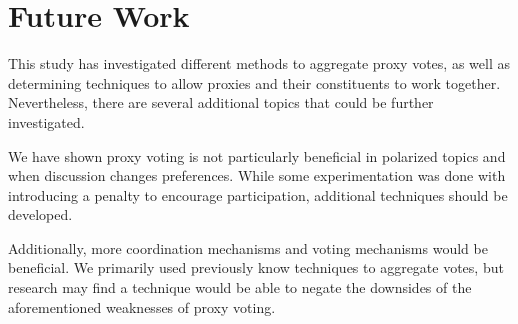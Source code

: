\section{Future Work}\label{sec:future-work}
This study has investigated different methods to aggregate proxy votes, as well as
determining techniques to allow proxies and their constituents to work together.
Nevertheless, there are several additional topics that could be further investigated.

We have shown proxy voting is not particularly beneficial in polarized topics and
when discussion changes preferences.
While some experimentation was done with introducing a penalty to encourage
participation, additional techniques should be developed.

Additionally, more coordination mechanisms and voting mechanisms would be beneficial.
We primarily used previously know techniques to aggregate votes, but research may
find a technique would be able to negate the downsides of the aforementioned
weaknesses of proxy voting. 
